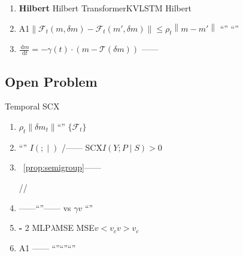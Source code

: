 \documentclass[11pt,a4paper]{article}
\theoremstyle{remark}
\newcommand{\Fforget}{\mathcal{F}}
\newcommand{\norm}[1]{\left\lVert#1\right\rVert}
\newcommand{\dd}{\,\mathrm{d}}
\begin{document}
\begin{enumerate}[label=\textbf{\,\arabic*:}, leftmargin=*]

    \item \textbf{Hilbert}
          Hilbert
          TransformerKVLSTM
          Hilbert

    \item \textbf{}
          A1$\norm{\Fforget_t(m, \delta m) - \Fforget_t(m', \delta m)} \leq \rho_t \norm{m - m'}$
          ``''
          ``''
          

    \item \textbf{}
          
          $\frac{\dd m}{\dd t} = -\gamma(t) \cdot (m - \mathcal{T}(\delta m))$
          ——

\end{enumerate}

\subsection{Open Problem}

Temporal SCX

\begin{enumerate}[label=\textbf{OP\,\arabic*}, leftmargin=*]

    \item \textbf{}
          $\rho_t$$\norm{\delta m_t}$``''
          $\{\Fforget_t\}$
          
          
          

    \item \textbf{}
          ``''\textbf{}
          $I(\text{}; \text{} \mid \text{})$
          /——
          SCX$I(Y; P \mid S) > 0$
          

    \item \textbf{}
          ~\ref{prop:semigroup}——
          
          
          //

    \item \textbf{}
          \textbf{}\textbf{}
          ——``''——
           vs 
          $\gamma$$v$
          ``''

    \item \textbf{-}
          2
          MLP$\lambda$MSE
          MSE$v < v_c$$v > v_c$
          

    \item \textbf{}
          A1
          ——
          ``''``''``''

\end{enumerate}
\end{document}
